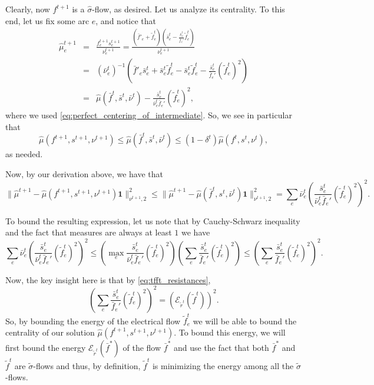 \documentclass[11pt, letterpaper]{article}
\newcommand{\onev}{\mathbf{1}}
\newcommand{\norm}[2]{\|#1\|_{#2}}
\newcommand{\energy}[2]{\mathcal{E}_{#1}(#2)}
\newcommand{\tf}{\tilde{f}}
\newcommand{\of}{\bar{f}}
\newcommand{\os}{\bar{s}}
\newcommand{\onu}{\bar{\nu}}
\newcommand{\hmu}{\hat{\mu}}
\newcommand{\vnu}{\boldsymbol{\mathit{\nu}}}
\newcommand{\ovnu}{\boldsymbol{\bar{\mathit{\nu}}}}
\newcommand{\hvmu}{\boldsymbol{\mathit{\hat{\mu}}}}
\newcommand{\tvsigma}{\boldsymbol{\mathit{\tilde{\sigma}}}}
\newcommand{\hvsigma}{\boldsymbol{\mathit{\hat{\sigma}}}}
\newcommand{\ff}{\boldsymbol{\mathit{f}}}
\newcommand{\tff}{\boldsymbol{\mathit{\tilde{f}}}}
\newcommand{\off}{\boldsymbol{\mathit{\bar{f}}}}
\newcommand{\trr}{\boldsymbol{\mathit{\tilde{r}}}}
\renewcommand{\ss}{\boldsymbol{\mathit{s}}}
\newcommand{\oss}{\boldsymbol{\bar{\mathit{s}}}}
\begin{document}
Clearly, now $\ff^{t+1}$ is a $\hvsigma$-flow, as desired. Let us analyze its centrality. To this end, let us fix some arc $e$, and notice that
\begin{eqnarray*}
\hmu^{t+1}_e &=& \frac{f_e^{t+1}s_e^{t+1}}{\nu_e^{t+1}}=\frac{(\of'_e + \tf_e^t)(\os_e^t - \frac{\os_e^t}{\of_e'}\tf_e^t)}{\nu_e^{t+1}}\\ &=&(\onu_e^{t})^{-1}\left(\of'_e\os_e^t+\os_e^t\tf_e^t-\os_e^t\tf_e^t-\frac{\os_e^t}{\of_e'} (\tf_e^t)^2\right)\\
&=&\hmu(\off^t,\oss^t,\ovnu^t)-\frac{\os_e^t}{\onu^t_e\of_e'} (\tf_e^t)^2,
\end{eqnarray*}
where we used \eqref{eq:perfect_centering_of_intermediate}. So, we see in particular that 
\[
\hmu(\ff^{t+1},\ss^{t+1},\vnu^{t+1})\leq \hmu(\off^t,\oss^t,\ovnu^t)\leq (1-\delta^t)\hmu(\ff^{t},\ss^{t},\vnu^{t}),
\]
as needed. 

Now, by our derivation above, we have that
\[
\norm{\hvmu^{t+1}-\hmu(\ff^{t+1},\ss^{t+1},\vnu^{t+1})\onev}{\vnu^{t+1},2}^2\leq \norm{\hvmu^{t+1}-\hmu(\off^{t},\ss^{t},\ovnu^{t})\onev}{\vnu^{t+1},2}^2 = \sum_e \onu_e^t \left(\frac{\os_e^t}{\onu^t_e\of_e'} (\tf_e^t)^2\right)^2.
\]

To bound the resulting expression, let us note that by Cauchy-Schwarz inequality and the fact that measures are always at least $1$ we have 
\[
\sum_e \onu_e^t \left(\frac{\os_e^t}{\onu^t_e\of_e'} (\tf_e^t)^2\right)^2\leq \left(\max_{e} \frac{\os_e^t}{\onu^t_e\of_e'} (\tf_e^t)^2\right)\left(\sum_{e} \frac{\os_e^t}{\of_e'} (\tf_e^t)^2\right)\leq \left(\sum_{e} \frac{\os_e^t}{\of_e'} (\tf_e^t)^2\right)^2.
\]

Now, the key insight here is that by \eqref{eq:tfft_resistances}, 
\[
\left(\sum_{e} \frac{\os_e^t}{\of_e'} (\tf_e^t)^2\right)^2=\left(\energy{\trr^t}{\tff^t}\right)^2.
\]
So, by bounding the energy of the electrical flow $\tf_e^t$ we will be able to bound the centrality of our solution $\hmu(\ff^{t+1},\ss^{t+1},\vnu^{t+1})$. 
To bound this energy, we will first bound the energy $\energy{\trr^t}{\off^*}$ of the flow $\off^*$ and use the fact that both $\off^*$ and $\tff^t$ are $\tvsigma$-flows and thus, by definition, $\tff^t$ is minimizing the energy among all the $\tvsigma$-flows. 
\end{document}
